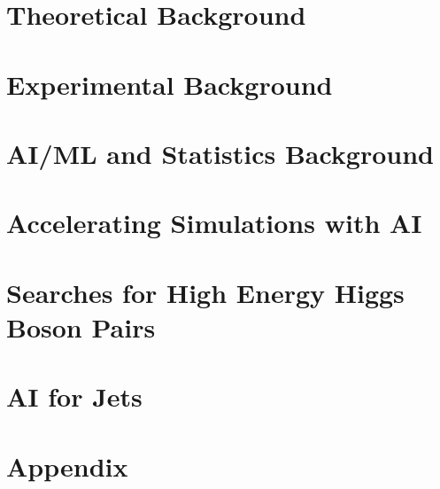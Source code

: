 \documentclass[12pt]{ucsddissertation}
\theoremstyle{definition}
\theoremstyle{definition}
\theoremstyle{definition}
\numberwithin{equation}{section}
\begin{document}


\part{Theoretical Background}
\label{part:sm}






\part{Experimental Background}
\label{part:epp}




\part{AI/ML and Statistics Background}
\label{part:aiml}




\part{Accelerating Simulations with AI}
\label{part:ml4sim}

 
 
 


\part{Searches for High Energy Higgs Boson Pairs}
\label{part:hh}




\part{AI for Jets}
\label{part:ml4jets}







\appendix
\part{Appendix}





\backmatter
\nocite{apsrev42Control}

 
\end{document}
